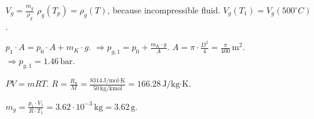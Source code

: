 \( V_g = \frac{m_g}{\rho_g} \)  
\( \rho_g(T_p) = \rho_g(T) \), because incompressible fluid.  
\( V_g(T_{1}) = V_g(500^\circ C) \).  

\( p_1 \cdot A = p_0 \cdot A + m_K \cdot g \).  
\( \Rightarrow p_{g,1} = p_0 + \frac{m_K \cdot g}{A} \).  
\( A = \pi \cdot \frac{D^2}{4} = \frac{\pi}{400} \, \text{m}^2 \).  
\( \Rightarrow p_{g,1} = 1.46 \, \text{bar} \).  

\( PV = mRT \).  
\( R = \frac{R_u}{M} = \frac{8314 \, \text{J/mol·K}}{50 \, \text{kg/kmol}} = 166.28 \, \text{J/kg·K} \).  

\( m_g = \frac{p_1 \cdot V_1}{R \cdot T_1} = 3.62 \cdot 10^{-3} \, \text{kg} = 3.62 \, \text{g} \).